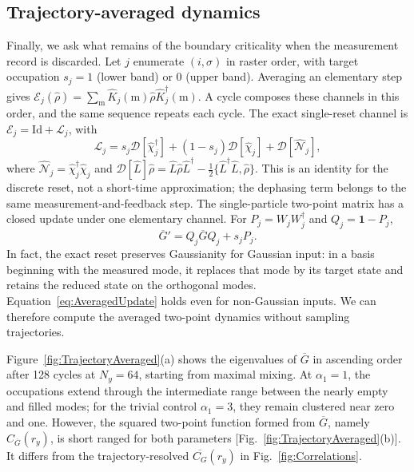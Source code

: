 \documentclass[aps,prb,10pt,twocolumn,superscriptaddress,longbibliography,floatfix]{revtex4-2}
\newcommand{\mc}[1]{\mathcal{#1}}
\newcommand{\Id}{\mathbf{1}}
\newcommand{\claudeadd}[1]{{\color{orange}#1}}
\begin{document}
{\color{blue}
\subsection{Trajectory-averaged dynamics}
\label{sec:TrajectoryAveraged}

Finally, we ask what remains of the boundary criticality when the measurement record is discarded. Let $j$ enumerate $(i,\sigma)$ in raster order, with target occupation $s_j=1$ (lower band) or $0$ (upper band). Averaging an elementary step gives $\mc E_j(\hat\rho)=\sum_{\mathrm m}\hat K_j(\mathrm m)\hat\rho\hat K_j^\dagger(\mathrm m)$. A cycle composes these channels in this order, and the same sequence repeats each cycle. The exact single-reset channel is $\mc E_j=\mathrm{Id}+\mc L_j$, with
\begin{equation}
 \mc L_j=s_j\mc D[\hat\chi_j^\dagger]+(1-s_j)\mc D[\hat\chi_j]+\mc D[\hat{\mc N}_j],
 \label{eq:AveragedChannel}
\end{equation}
where $\hat{\mc N}_j=\hat\chi_j^\dagger\hat\chi_j$ and $\mc D[\hat L]\hat\rho=\hat L\hat\rho\hat L^\dagger-\tfrac12\{\hat L^\dagger\hat L,\hat\rho\}$. This is an identity for the discrete reset, not a short-time approximation; the dephasing term belongs to the same measurement-and-feedback step. The single-particle two-point matrix has a closed update under one elementary channel. For \claudeadd{$P_j=W_jW_j^\dagger$} and $Q_j=\Id-P_j$,
\begin{equation}
 \overline G'=Q_j\overline GQ_j+s_jP_j.
 \label{eq:AveragedUpdate}
\end{equation}
In fact, the exact reset preserves Gaussianity for Gaussian input: in a basis beginning with the measured mode, it replaces that mode by its target state and retains the reduced state on the orthogonal modes. Equation~\eqref{eq:AveragedUpdate} holds even for non-Gaussian inputs. We can therefore compute the averaged two-point dynamics without sampling trajectories.

Figure~\ref{fig:TrajectoryAveraged}(a) shows the eigenvalues of $\overline G$ in ascending order after 128 cycles at $N_y=64$, starting from maximal mixing. At $\alpha_1=1$, the occupations extend through the intermediate range between the nearly empty and filled modes; for the trivial control $\alpha_1=3$, they remain clustered near zero and one. However, the squared two-point function formed from $\overline G$, namely $C_{\overline G}(r_y)$, is short ranged for both parameters [Fig.~\ref{fig:TrajectoryAveraged}(b)]. It differs from the trajectory-resolved $\overline{C_G}(r_y)$ in Fig.~\ref{fig:Correlations}.

}
\end{document}
